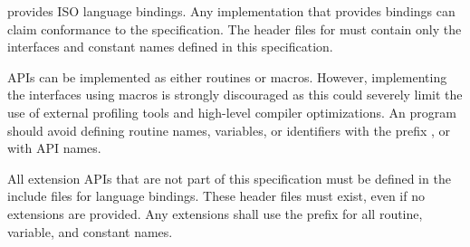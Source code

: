 \openshmem provides ISO \Cstd language bindings. Any implementation that
provides \Cstd bindings can claim conformance to the specification. The
\openshmem header files  for \Cstd must contain only the
interfaces and constant names defined in this specification.

\openshmem \acp{API} can be implemented as either routines or macros. However,
implementing the interfaces using macros is strongly discouraged as this could
severely limit the use of external profiling tools and high-level compiler
optimizations. An \openshmem program should avoid defining routine names,
variables, or identifiers with the prefix \shmemprefix, \shmemprefixC or with
\openshmem \ac{API} names.

All \openshmem extension \acp{API} that are not part of this specification must
be defined in the  include files for language bindings. These
header files must exist, even if no extensions are provided. Any extensions
shall use the  prefix for all routine, variable, and constant
names.
